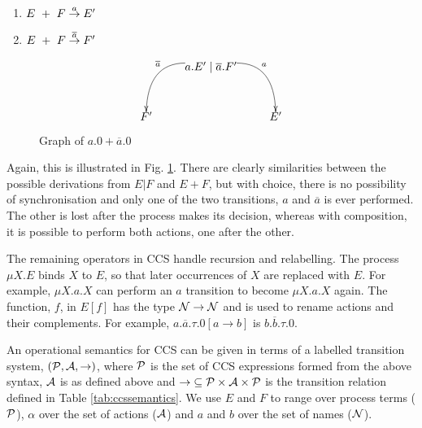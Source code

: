 \begin{enumerate}
\item $E\ +\ F \stackrel{a}{\rightarrow} E'$
\item $E\ +\ F \stackrel{\overline{a}}{\rightarrow} F'$
\end{enumerate}


\begin{figure}  
  \centering
\[
\xy
(20,0)*{a.E' \mid \overline{a}.F'}="1";
(0,-15)*{F'}="2";
(40,-15)*{E'}="3";
{\ar@/^2pc/^{a} "1";"3"};
{\ar@/_2pc/_{\overline{a}} "1";"2"};
\endxy
\]
  \caption{Graph of $a.0 + \overline{a}.0$}
  \label{fig:graph2}
\end{figure}

Again, this is illustrated in Fig. \ref{fig:graph2}.  There are
clearly similarities between the possible derivations from $E|F$ and
$E+F$, but with choice, there is no possibility of synchronisation and
only one of the two transitions, $a$ and $\overline{a}$ is ever
performed.  The other is lost after the process makes its decision,
whereas with composition, it is possible to perform both actions, one
after the other.

The remaining operators in CCS handle recursion and relabelling.  The
process $\mu X.E$ binds $X$ to $E$, so that later occurrences of $X$
are replaced with $E$.  For example, $\mu X.a.X$ can perform an $a$
transition to become $\mu X.a.X$ again.  The function, $f$, in $E[f]$
has the type $\text{$\mathcal{N}$} \rightarrow \text{$\mathcal{N}$}$ and is used to rename actions
and their complements.  For example, $a.\overline{a}.\tau.0[a
  \rightarrow b]$ is $b.\overline{b}.\tau.0$.

An operational semantics for CCS can be given in terms of a labelled
transition system, $(\text{$\mathcal{P}$}, \text{$\mathcal{A}$}, \rightarrow)$, where $\text{$\mathcal{P}$}$
is the set of CCS expressions formed from the above syntax, $\text{$\mathcal{A}$}$
is as defined above and $\mathop{\rightarrow} \mathrel{\subseteq}
\text{$\mathcal{P}$} \times \text{$\mathcal{A}$} \times \text{$\mathcal{P}$}$ is the transition relation
defined in Table \ref{tab:ccssemantics}.  We use $E$ and $F$ to range
over process terms ($\text{$\mathcal{P}$}$), $\alpha$ over the set of actions
($\text{$\mathcal{A}$}$) and $a$ and $b$ over the set of names ($\text{$\mathcal{N}$}$).

